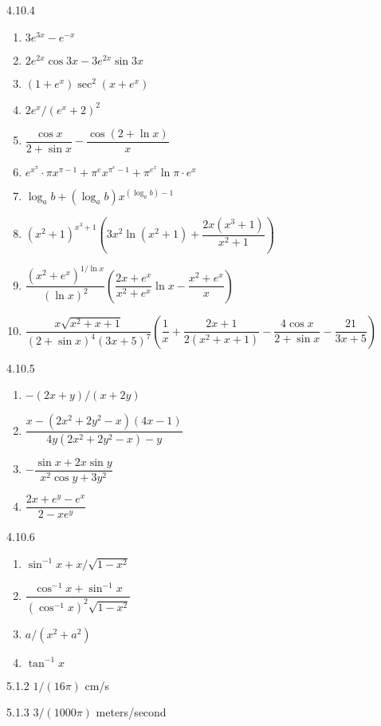 \begin{Answer}{4.10.4}
\begin{enumerate}
	\item	$3e^{3x}-e^{-x}$
	\item	$2e^{2x}\cos 3x-3e^{2x}\sin 3x$
	\item	$(1+e^x)\sec^2(x+e^x)$
	\item	$2e^x/(e^x+2)^2$
	\item	$\dfrac{\cos x}{2+\sin x}-\dfrac{\cos(2+\ln	x)}{x}$
	\item	$e^{x^{\pi}}\cdot\pi x^{\pi-1}+\pi^e x^{\pi^e-1}+\pi^{e^x}\ln\pi\cdot e^x$
	\item	$\log_{a}b+(\log_{a}b) x^{(\log_{a}b)-1}$
	\item	$(x^2+1)^{x^3+1}\left(3x^2\ln(x^2+1)+\dfrac{2x(x^3+1)}{x^2+1}\right)$
	\item	$\dfrac{(x^2+e^x)^{1/\ln x}}{(\ln x)^2}\left(\dfrac{2x+e^x}{x^2+e^x}\ln	x-\dfrac{x^2+e^x}{x}\right)$
	\item	$\dfrac{x\sqrt{x^2+x+1}}{(2+\sin x)^4 (3x+5)^7} \left(\dfrac{1}{x}+\dfrac{2x+1}{2(x^2+x+1)}-\dfrac{4\cos x}{2+\sin x}-\dfrac{21}{3x+5}\right)$
\end{enumerate}
\end{Answer}
\begin{Answer}{4.10.5}
\begin{enumerate}
	\item	$-(2x+y)/(x+2y)$
	\item	$\dfrac{x-(2x^2+2y^2-x) (4x-1)}{4y(2x^2+2y^2-x)-y}$
	\item	$-\dfrac{\sin x+2x\sin y}{x^2\cos y+3y^2}$
	\item	$\dfrac{2x+e^y-e^x}{2-xe^y}$
\end{enumerate}
\end{Answer}
\begin{Answer}{4.10.6}
\begin{enumerate}
	\item	$\sin^{-1}x+x/\sqrt{1-x^2}$
	\item	$\dfrac{\cos^{-1}x+\sin^{-1}x}{(\cos^{-1}x)^2 \sqrt{1-x^2}}$
	\item	$a/(x^2+a^2)$
	\item	$\tan^{-1}x$
\end{enumerate}
\end{Answer}
\begin{Answer}{5.1.2}
	$1/(16\pi)$ cm/s
\end{Answer}
\begin{Answer}{5.1.3}
	$3/(1000\pi)$ meters/second
\end{Answer}
